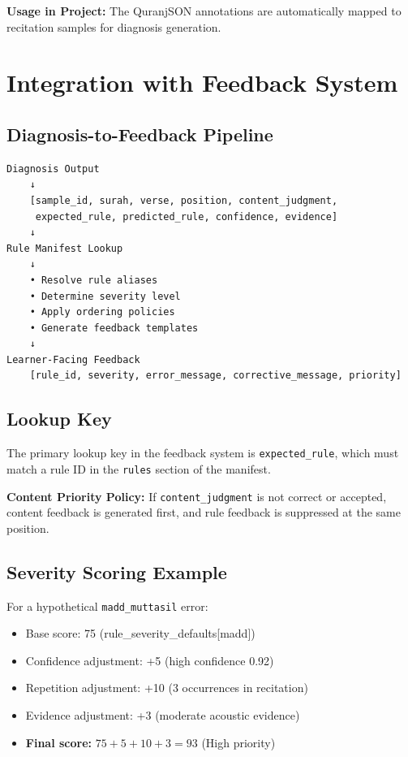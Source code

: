 \textbf{Usage in Project:} The QuranjSON annotations are automatically mapped to recitation samples for diagnosis generation.

\newpage

\section{Integration with Feedback System}

\subsection{Diagnosis-to-Feedback Pipeline}

\begin{verbatim}
Diagnosis Output
    ↓
    [sample_id, surah, verse, position, content_judgment, 
     expected_rule, predicted_rule, confidence, evidence]
    ↓
Rule Manifest Lookup
    ↓
    • Resolve rule aliases
    • Determine severity level
    • Apply ordering policies
    • Generate feedback templates
    ↓
Learner-Facing Feedback
    [rule_id, severity, error_message, corrective_message, priority]
\end{verbatim}

\subsection{Lookup Key}

The primary lookup key in the feedback system is \texttt{expected\_rule}, which must match a rule ID in the \texttt{rules} section of the manifest.

\textbf{Content Priority Policy:} If \texttt{content\_judgment} is not correct or accepted, content feedback is generated first, and rule feedback is suppressed at the same position.

\subsection{Severity Scoring Example}

For a hypothetical \texttt{madd\_muttasil} error:

\begin{itemize}
    \item Base score: 75 (rule\_severity\_defaults[madd])
    \item Confidence adjustment: +5 (high confidence 0.92)
    \item Repetition adjustment: +10 (3 occurrences in recitation)
    \item Evidence adjustment: +3 (moderate acoustic evidence)
    \item \textbf{Final score:} $75 + 5 + 10 + 3 = 93$ (High priority)
\end{itemize}

